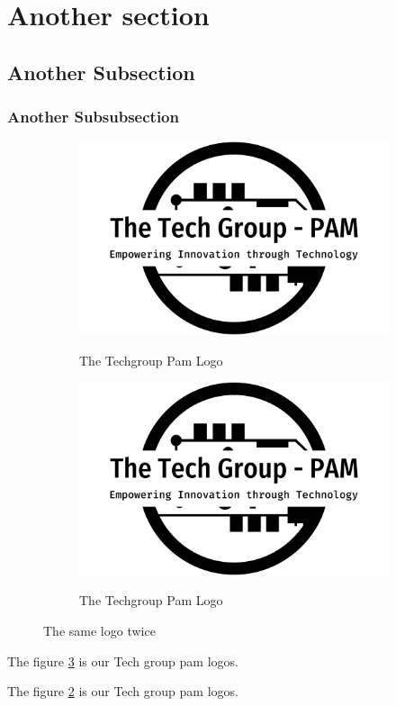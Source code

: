 \documentclass{book}
\begin{document}
	\subparagraph{}
	\lipsum[1]
	\section{Another section}
	\subsection{Another Subsection}
	\subsubsection{Another Subsubsection}
	\lipsum[1-3]



    \begin{figure}[h!] %
        \begin{subfigure}[b]{0.4\linewidth}
            \caption{The Techgroup Pam Logo}
            \includegraphics[width=\linewidth]{the-tech-group-pam-high-resolution-logo-black-on-transparent-background_01.png}
            \label{labe1}
        \end{subfigure}
        \begin{subfigure}[b]{0.4\linewidth}
            \caption{The Techgroup Pam Logo}
            \includegraphics[width=\linewidth]{the-tech-group-pam-high-resolution-logo-black-on-transparent-background_01.png}
            \label{label2}
        \end{subfigure}
        \caption{The same logo twice}
        \label{fig:logos2}
    \end{figure}

    The figure \ref{fig:logos2} is our Tech group pam logos. 

    \newpage 

    The figure \ref{label2} is our Tech group pam logos. 
\end{document}
